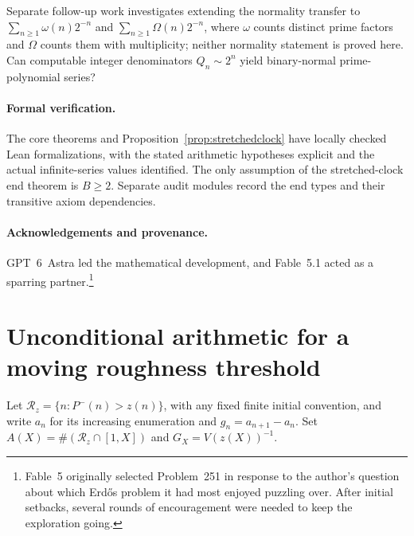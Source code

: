 \documentclass[11pt,a4paper]{article}
\begin{document}
Separate follow-up work investigates extending the normality transfer to
$\sum_{n\ge1}\omega(n)2^{-n}$ and $\sum_{n\ge1}\Omega(n)2^{-n}$,
where $\omega$ counts distinct prime factors and $\Omega$ counts them
with multiplicity; neither normality statement is proved here.
Can computable integer denominators $Q_n\sim2^n$ yield binary-normal
prime-polynomial series?

\paragraph{Formal verification.}
The core theorems and Proposition~\ref{prop:stretchedclock} have locally
checked Lean formalizations, with the stated arithmetic hypotheses
explicit and the actual infinite-series values identified. The only
assumption of the stretched-clock end theorem is $B\ge2$. Separate
audit modules record the end types and their transitive axiom dependencies.

\paragraph{Acknowledgements and provenance.}
GPT~6~Astra led the mathematical development, and Fable~5.1 acted as a
sparring partner.\footnote{Fable~5 originally selected Problem~251 in response to the author's
question about which Erd\H os problem it had most enjoyed puzzling over.
After initial setbacks, several rounds of encouragement were needed
to keep the exploration going.}

\appendix
\section[Unconditional rough integers]{Unconditional arithmetic for a moving roughness threshold}
\label{app:rough}

Let $\mathcal R_z=\{n:P^-(n)>z(n)\}$, with any fixed finite initial
convention, and write $a_n$ for its increasing enumeration and $g_n=a_{n+1}-a_n$.
Set $A(X)=\#(\mathcal R_z\cap[1,X])$ and $G_X=V(z(X))^{-1}$.
\end{document}
